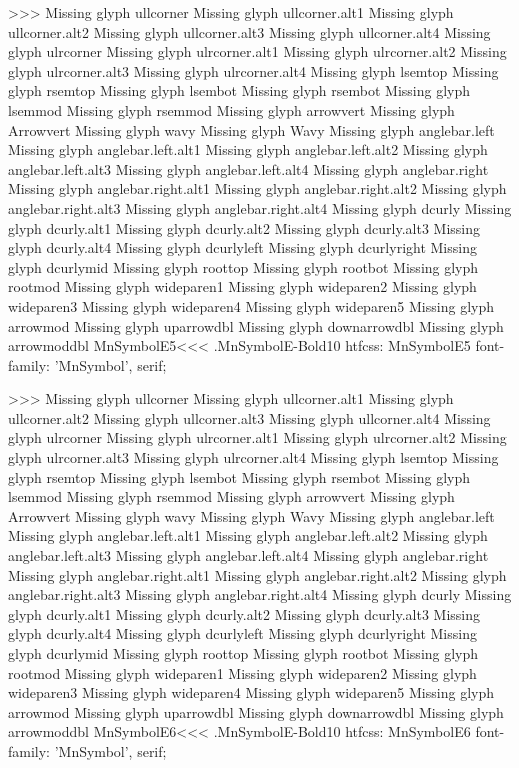 >>>
Missing glyph	ullcorner
Missing glyph	ullcorner.alt1
Missing glyph	ullcorner.alt2
Missing glyph	ullcorner.alt3
Missing glyph	ullcorner.alt4
Missing glyph	ulrcorner
Missing glyph	ulrcorner.alt1
Missing glyph	ulrcorner.alt2
Missing glyph	ulrcorner.alt3
Missing glyph	ulrcorner.alt4
Missing glyph	lsemtop
Missing glyph	rsemtop
Missing glyph	lsembot
Missing glyph	rsembot
Missing glyph	lsemmod
Missing glyph	rsemmod
Missing glyph	arrowvert
Missing glyph	Arrowvert
Missing glyph	wavy
Missing glyph	Wavy
Missing glyph	anglebar.left
Missing glyph	anglebar.left.alt1
Missing glyph	anglebar.left.alt2
Missing glyph	anglebar.left.alt3
Missing glyph	anglebar.left.alt4
Missing glyph	anglebar.right
Missing glyph	anglebar.right.alt1
Missing glyph	anglebar.right.alt2
Missing glyph	anglebar.right.alt3
Missing glyph	anglebar.right.alt4
Missing glyph	dcurly
Missing glyph	dcurly.alt1
Missing glyph	dcurly.alt2
Missing glyph	dcurly.alt3
Missing glyph	dcurly.alt4
Missing glyph	dcurlyleft
Missing glyph	dcurlyright
Missing glyph	dcurlymid
Missing glyph	roottop
Missing glyph	rootbot
Missing glyph	rootmod
Missing glyph	wideparen1
Missing glyph	wideparen2
Missing glyph	wideparen3
Missing glyph	wideparen4
Missing glyph	wideparen5
Missing glyph	arrowmod
Missing glyph	uparrowdbl
Missing glyph	downarrowdbl
Missing glyph	arrowmoddbl
\<MnSymbolE5\><<<
.MnSymbolE-Bold10
htfcss:  MnSymbolE5  font-family: 'MnSymbol', serif;

>>>
Missing glyph	ullcorner
Missing glyph	ullcorner.alt1
Missing glyph	ullcorner.alt2
Missing glyph	ullcorner.alt3
Missing glyph	ullcorner.alt4
Missing glyph	ulrcorner
Missing glyph	ulrcorner.alt1
Missing glyph	ulrcorner.alt2
Missing glyph	ulrcorner.alt3
Missing glyph	ulrcorner.alt4
Missing glyph	lsemtop
Missing glyph	rsemtop
Missing glyph	lsembot
Missing glyph	rsembot
Missing glyph	lsemmod
Missing glyph	rsemmod
Missing glyph	arrowvert
Missing glyph	Arrowvert
Missing glyph	wavy
Missing glyph	Wavy
Missing glyph	anglebar.left
Missing glyph	anglebar.left.alt1
Missing glyph	anglebar.left.alt2
Missing glyph	anglebar.left.alt3
Missing glyph	anglebar.left.alt4
Missing glyph	anglebar.right
Missing glyph	anglebar.right.alt1
Missing glyph	anglebar.right.alt2
Missing glyph	anglebar.right.alt3
Missing glyph	anglebar.right.alt4
Missing glyph	dcurly
Missing glyph	dcurly.alt1
Missing glyph	dcurly.alt2
Missing glyph	dcurly.alt3
Missing glyph	dcurly.alt4
Missing glyph	dcurlyleft
Missing glyph	dcurlyright
Missing glyph	dcurlymid
Missing glyph	roottop
Missing glyph	rootbot
Missing glyph	rootmod
Missing glyph	wideparen1
Missing glyph	wideparen2
Missing glyph	wideparen3
Missing glyph	wideparen4
Missing glyph	wideparen5
Missing glyph	arrowmod
Missing glyph	uparrowdbl
Missing glyph	downarrowdbl
Missing glyph	arrowmoddbl
\<MnSymbolE6\><<<
.MnSymbolE-Bold10
htfcss:  MnSymbolE6  font-family: 'MnSymbol', serif;

